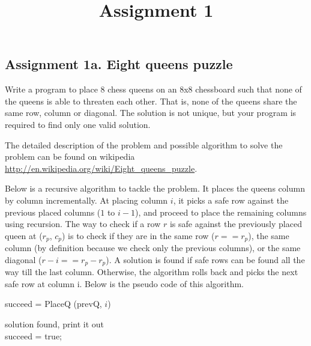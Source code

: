 \documentclass[12pt,a4paper,hidelinks,fleqn]{article}            %
\title{\vspace{-3ex}Assignment 1\vspace{-7ex}}
\date{}
\begin{document}
\maketitle
\subsection*{Assignment 1a. Eight queens puzzle}
Write a program to place 8 chess queens on an 8x8 chessboard 
such that none of the queens is able to threaten each other.
That is, none of the queens share the same row, column or diagonal.
The solution is not unique, but your program is required to find only one valid solution.

The detailed description of the problem and possible algorithm to solve the problem can be found on wikipedia \url{http://en.wikipedia.org/wiki/Eight_queens_puzzle}.

Below is a recursive algorithm to tackle the problem.
It places the queens column by column incrementally. 
At placing column $i$, it picks a safe row against the previous placed columns ($1$ to $i-1$), 
and proceed to place the remaining columns using recursion. 
The way to check if a row $r$ is safe against the previously placed queen at ($r_p$, $c_p$) is to check if they are in the same row ($r == r_p$), the same column (by definition because we check only the previous columns), or the same diagonal ($r - i == r_p - r_p$).
A solution is found if safe rows can be found all the way till the last column.
Otherwise, the algorithm rolls back and picks the next safe row at column i.
Below is the pseudo code of this algorithm.

\begin{algorithm}
	\caption{succeed = PlaceQ (prevQ, $i$)}
	 {
		solution found, print it out \\
		succeed = true;
	}
\end{algorithm}
\end{document}
